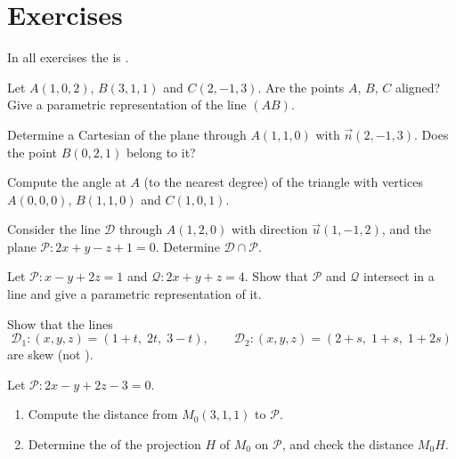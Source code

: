 \section{Exercises}

In all exercises the  is .

\begin{exercise}[$\star$]\label{exo:g12:space:1}
Let $A(1, 0, 2)$, $B(3, 1, 1)$ and $C(2, -1, 3)$. Are the points $A$, $B$,
$C$ aligned? Give a parametric representation of the line $(AB)$.
\end{exercise}

\begin{exercise}[$\star$]\label{exo:g12:space:2}
Determine a Cartesian  of the plane through $A(1, 1, 0)$ with
 $\vec n(2, -1, 3)$. Does the point $B(0, 2, 1)$ belong to it?
\end{exercise}

\begin{exercise}[$\star$]\label{exo:g12:space:3}
Compute the angle at $A$ (to the nearest degree) of the triangle with
vertices $A(0,0,0)$, $B(1, 1, 0)$ and $C(1, 0, 1)$.
\end{exercise}

\begin{exercise}[$\star\star$]\label{exo:g12:space:4}
Consider the line $\mathcal D$ through $A(1, 2, 0)$ with direction
$\vec u(1, -1, 2)$, and the plane $\mathcal P : 2x + y - z + 1 = 0$.
Determine $\mathcal D \cap \mathcal P$.
\end{exercise}

\begin{exercise}[$\star\star$]\label{exo:g12:space:5}
Let $\mathcal P : x - y + 2z = 1$ and $\mathcal Q : 2x + y + z = 4$.
Show that $\mathcal P$ and $\mathcal Q$ intersect in a line and give a
parametric representation of it.
\end{exercise}

\begin{exercise}[$\star\star$]\label{exo:g12:space:6}
Show that the lines
\[
\mathcal D_1 : (x, y, z) = (1 + t,\; 2t,\; 3 - t), \qquad
\mathcal D_2 : (x, y, z) = (2 + s,\; 1 + s,\; 1 + 2s)
\]
are skew (not ).
\end{exercise}

\begin{exercise}[$\star\star$]\label{exo:g12:space:7}
Let $\mathcal P : 2x - y + 2z - 3 = 0$.
\begin{enumerate}
  \item Compute the distance from $M_0(3, 1, 1)$ to $\mathcal P$.
  \item Determine the  of the  projection $H$ of
        $M_0$ on $\mathcal P$, and check the distance $M_0H$.
\end{enumerate}
\end{exercise}

